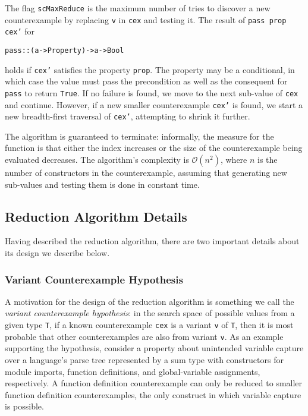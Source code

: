 \documentclass{sigplanconf}
\newenvironment{code}{\begin{alltt}\footnotesize}{\end{alltt}}
\newcommand{\ttp}[1]{\texttt{#1}}
\begin{document}
The flag \ttp{scMaxReduce} is the maximum number of tries to discover a new
counterexample by replacing \ttp{v} in \ttp{cex} and testing it.  The result of
\ttp{pass prop cex'} for
%
\begin{code}
pass :: (a -> Property) -> a -> Bool
\end{code}
%
\noindent
holds if \ttp{cex'} satisfies the property \ttp{prop}.  The property may be a
conditional, in which case the value must pass the precondition as well as the
consequent for \ttp{pass} to return \ttp{True}.  If no failure is found, we move
to the next sub-value of \ttp{cex} and continue.  However, if a new smaller
counterexample \ttp{cex'} is found, we start a new breadth-first traversal of
\ttp{cex'}, attempting to shrink it further.

The algorithm is guaranteed to terminate: informally, the measure for the
function is that either the index increases or the size of the counterexample
being evaluated decreases.  The algorithm's complexity is
$\mathcal{O}(n^2)$, where $n$ is the number of constructors in the
counterexample, assuming that generating new sub-values and testing them is done
in constant time.

\subsection{Reduction Algorithm Details}\label{sec:details}
Having described the reduction algorithm, there are two important details about
its design we describe below.

\subsubsection{Variant Counterexample Hypothesis}\label{sec:variant}
A motivation for the design of the reduction algorithm is something we call the
\emph{variant counterexample hypothesis}: in the search space of possible values
from a given type \ttp{T}, if a known counterexample \ttp{cex} is a variant
\ttp{v} of \ttp{T}, then it is most probable that other counterexamples are also
from variant \ttp{v}.  As an example supporting the hypothesis, consider a
property about unintended variable capture over a language's parse tree
represented by a sum type with constructors for module imports, function
definitions, and global-variable assignments, respectively.  A function
definition counterexample can only be reduced to smaller function definition
counterexamples, the only construct in which variable capture is possible.
\end{document}
